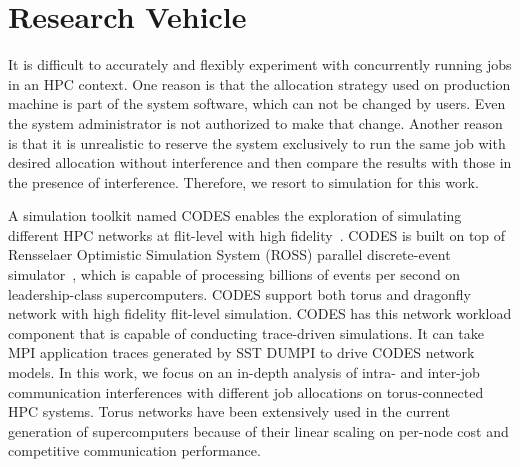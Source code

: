\section{Research Vehicle}
\label{sec:codes}

It is difficult to accurately and flexibly experiment with concurrently running jobs in an HPC context. 
One reason is that the allocation strategy used on production machine is part of the system software, 
which can not be changed by users. 
Even the system administrator is not authorized to make that change. 
Another reason is that it is unrealistic to reserve the system exclusively 
to run the same job with desired allocation without interference and 
then compare the results with those in the presence of interference. 
Therefore, we resort to simulation for this work.


A simulation toolkit named CODES enables the exploration of simulating 
different HPC networks at flit-level with high fidelity~\cite{Jason-2011, mubarak-sc2012}. 
CODES is built on top of Rensselaer Optimistic Simulation System (ROSS) parallel discrete-event simulator~\cite{ross}, 
which is capable of processing billions of events per second on leadership-class supercomputers. 
CODES support both torus and dragonfly network with high fidelity flit-level simulation. 
CODES has this network workload component that is capable of conducting trace-driven simulations. 
It can take MPI application traces generated by SST DUMPI \cite{sst} to drive CODES network models. 
In this work, we focus on an in-depth analysis of intra- and inter-job 
communication interferences with different job allocations on torus-connected HPC systems. 
Torus networks have been extensively used in the current generation of supercomputers 
because of their linear scaling on per-node cost and competitive communication performance.


